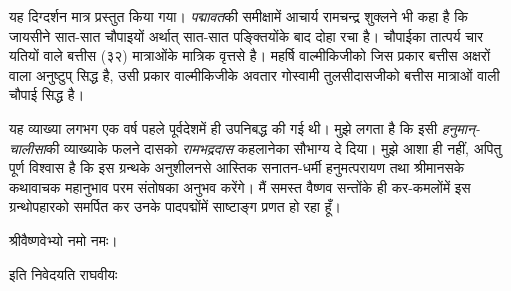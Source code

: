 \begin{sloppypar}\justifying
\noindent यह दिग्दर्शन मात्र प्रस्तुत किया गया। \textit{पद्मावत}की समीक्षामें आचार्य रामचन्द्र शुक्लने भी कहा है कि जायसीने सात-सात चौपाइयों अर्थात् सात-सात पङ्क्तियोंके बाद दोहा रचा है। चौपाईका तात्पर्य चार यतियों वाले बत्तीस (३२) मात्राओंके मात्रिक वृत्तसे है। महर्षि वाल्मीकिजीको जिस प्रकार बत्तीस अक्षरों वाला अनुष्टुप् सिद्ध है, उसी प्रकार वाल्मीकिजीके अवतार गोस्वामी तुलसीदासजीको बत्तीस मात्राओं वाली चौपाई सिद्ध है।
\end{sloppypar}
\begin{sloppypar}\justifying
यह व्याख्या लगभग एक वर्ष पहले पूर्वदेशमें ही उपनिबद्ध की गई थी। मुझे लगता है कि इसी \textit{हनुमान्‌-चालीसा}की व्याख्याके फलने दासको \textit{रामभद्रदास} कहलानेका सौभाग्य दे दिया। मुझे आशा ही नहीं, अपितु पूर्ण विश्वास है कि इस ग्रन्थके अनुशीलनसे आस्तिक सनातन-धर्मी हनुमत्परायण तथा श्रीमानसके कथावाचक महानुभाव परम संतोषका अनुभव करेंगे। मैं समस्त वैष्णव सन्तोंके ही कर-कमलोंमें इस ग्रन्थोपहारको समर्पित कर उनके पादपद्मोंमें साष्टाङ्ग प्रणत हो रहा हूँ।
\end{sloppypar}
\begin{sloppypar}\justifying
श्रीवैष्णवेभ्यो नमो नमः।
\end{sloppypar}
\begin{sloppypar}\justifying
इति निवेदयति राघवीयः
\end{sloppypar}
\paraseplotus
